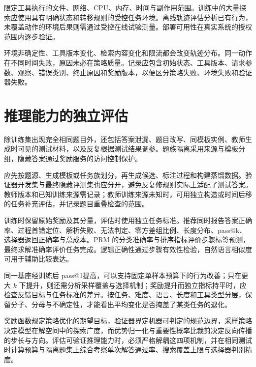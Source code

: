 \documentclass[../textbook.tex]{subfiles}
\begin{document}
限定工具执行的文件、网络、CPU、内存、时间与副作用范围。训练中的大量探索应使用具有明确状态和转移规则的受控任务环境。离线轨迹评估分析已有行为，未覆盖动作的环境后果则需通过受控在线试验测量。部署可用性在真实系统的授权范围内逐步验证。

环境非确定性、工具版本变化、检索内容变化和限流都会改变轨迹分布。同一动作在不同时间失败，原因未必在策略质量。记录应包含初始状态、工具版本、请求参数、观察、错误类别、终止原因和奖励版本，以便区分策略失败、环境失败和验证器失败。

\section{推理能力的独立评估}

除训练集出现完全相同题目外，还包括答案泄漏、题目改写、同模板实例、教师生成时可见的测试材料，以及反复根据测试结果调参。题族隔离采用来源与模板分组，隐藏答案通过奖励服务的访问控制保护。

应先按题源、生成模板或任务族划分，再生成候选、标注过程和构建蒸馏数据。验证器开发集与最终隐藏评测集也应分开，避免反复修规则实际上适配了测试答案。教师版本和已知训练来源需记录；教师训练来源未知时，可用独立构造或时间后移的任务补充评估，并记录题目重叠检查的范围。

训练时保留原始奖励及其分量，评估时使用独立任务标准。推荐同时报告答案正确率、过程首错定位、解析失败、无法判定、零方差组比例、长度分布、pass@k、选择器返回正确率与总成本。PRM 的分类准确率与排序指标评价步骤标签预测，最终求解准确率评价任务完成。逻辑正确性通过步骤有效性检验，自然语言相似度可用于辅助比较表达。

同一基座经训练后 pass@1提高，可以支持固定单样本预算下的行为改善；只在更大 $k$ 下提升，则还需分析采样覆盖与选择机制；奖励提升而独立指标持平时，应检查反馈目标与任务标准的差异。按任务、难度、语言、长度和工具类型分层，保留分子、分母与不确定性，才能看出平均变化是否掩盖了某类任务的退化。

\begin{note}[可验证推理训练的机制解耦与评估原则]
奖励函数规定策略优化的期望目标，验证器界定机器可判定的规范边界，采样策略决定模型在解空间中的探索广度，而优势归一化与重要性概率比裁剪决定反向传播的步长与方向。评估可验证推理能力时，必须严格解耦这四项机制，并在相同测试时计算预算与隔离题集上综合考察单次解答通过率、搜索覆盖上限与选择器判别精度。
\end{note}





\chapterreferences
\myendchapterdocument
\end{document}
